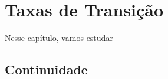 \chapter{Taxas de Transição}
\label{cap:taxas}

Nesse capítulo, vamos estudar 


\section{Continuidade}
\label{sec:continuidade}



